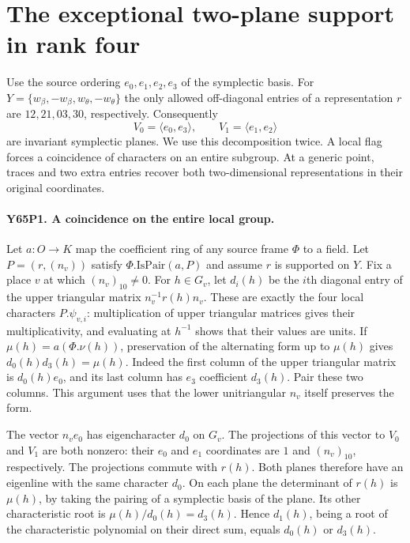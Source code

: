 \section{The exceptional two-plane support in rank four}

Use the source ordering $e_0,e_1,e_2,e_3$ of the symplectic basis.
For $Y=\{w_\beta,-w_\beta,w_\theta,-w_\theta\}$ the only allowed
off-diagonal entries of a representation $r$ are
$12,21,03,30$, respectively. Consequently
\[
 V_0=\langle e_0,e_3\rangle,\qquad V_1=\langle e_1,e_2\rangle
\]
are invariant symplectic planes. We use this decomposition twice.
A local flag forces a coincidence of characters on an entire subgroup.
At a generic point, traces and two extra entries recover both
two-dimensional representations in their original coordinates.

\paragraph{Y65P1. A coincidence on the entire local group.}
Let $a:O\to K$ map the coefficient ring of any source frame $\Phi$ to
a field. Let $P=(r,(n_v))$ satisfy $\Phi.\mathrm{IsPair}(a,P)$ and
assume $r$ is supported on $Y$. Fix a place $v$ at which
$(n_v)_{10}\ne0$. For $h\in G_v$, let $d_i(h)$ be the $i$th diagonal
entry of the upper triangular matrix $n_v^{-1}r(h)n_v$.
These are exactly the four local characters $P.\psi_{v,i}$:
multiplication of upper triangular matrices gives their multiplicativity,
and evaluating at $h^{-1}$ shows that their values are units.
If $\mu(h)=a(\Phi.\nu(h))$, preservation of the alternating form
up to $\mu(h)$ gives $d_0(h)d_3(h)=\mu(h)$. Indeed the first column
of the upper triangular matrix is $d_0(h)e_0$, and its last column
has $e_3$ coefficient $d_3(h)$. Pair these two columns. This argument
uses that the lower unitriangular $n_v$ itself preserves the form.

The vector $n_v e_0$ has eigencharacter $d_0$ on $G_v$. The projections
of this vector to $V_0$ and $V_1$ are both nonzero: their $e_0$ and
$e_1$ coordinates are $1$ and $(n_v)_{10}$, respectively. The projections
commute with $r(h)$. Both planes therefore have an eigenline with the same
character $d_0$. On each plane the determinant of $r(h)$ is $\mu(h)$,
by taking the pairing of a symplectic basis of the plane. Its other
characteristic root is $\mu(h)/d_0(h)=d_3(h)$. Hence $d_1(h)$, being a
root of the characteristic polynomial on their direct sum, equals
$d_0(h)$ or $d_3(h)$.

